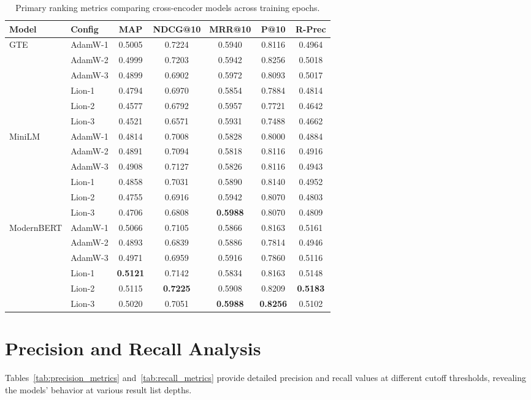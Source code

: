 \begin{table}[htbp]
\centering
\caption{Primary ranking metrics comparing cross-encoder models across training epochs.}
\label{tab:primary_metrics}
\small
\begin{tabular}{llccccc}
\toprule
\textbf{Model} & \textbf{Config} & \textbf{MAP} & \textbf{NDCG@10} & \textbf{MRR@10} & \textbf{P@10} & \textbf{R-Prec} \\
\midrule
\multirow{6}{*}{GTE} & AdamW-1 & 0.5005 & 0.7224 & 0.5940 & 0.8116 & 0.4964 \\
 & AdamW-2 & 0.4999 & 0.7203 & 0.5942 & 0.8256 & 0.5018 \\
 & AdamW-3 & 0.4899 & 0.6902 & 0.5972 & 0.8093 & 0.5017 \\
 & Lion-1 & 0.4794 & 0.6970 & 0.5854 & 0.7884 & 0.4814 \\
 & Lion-2 & 0.4577 & 0.6792 & 0.5957 & 0.7721 & 0.4642 \\
 & Lion-3 & 0.4521 & 0.6571 & 0.5931 & 0.7488 & 0.4662 \\
\midrule
\multirow{6}{*}{MiniLM} & AdamW-1 & 0.4814 & 0.7008 & 0.5828 & 0.8000 & 0.4884 \\
 & AdamW-2 & 0.4891 & 0.7094 & 0.5818 & 0.8116 & 0.4916 \\
 & AdamW-3 & 0.4908 & 0.7127 & 0.5826 & 0.8116 & 0.4943 \\
 & Lion-1 & 0.4858 & 0.7031 & 0.5890 & 0.8140 & 0.4952 \\
 & Lion-2 & 0.4755 & 0.6916 & 0.5942 & 0.8070 & 0.4803 \\
 & Lion-3 & 0.4706 & 0.6808 & \textbf{0.5988} & 0.8070 & 0.4809 \\
\midrule
\multirow{6}{*}{ModernBERT} & AdamW-1 & 0.5066 & 0.7105 & 0.5866 & 0.8163 & 0.5161 \\
 & AdamW-2 & 0.4893 & 0.6839 & 0.5886 & 0.7814 & 0.4946 \\
 & AdamW-3 & 0.4971 & 0.6959 & 0.5916 & 0.7860 & 0.5116 \\
 & Lion-1 & \textbf{0.5121} & 0.7142 & 0.5834 & 0.8163 & 0.5148 \\
 & Lion-2 & 0.5115 & \textbf{0.7225} & 0.5908 & 0.8209 & \textbf{0.5183} \\
 & Lion-3 & 0.5020 & 0.7051 & \textbf{0.5988} & \textbf{0.8256} & 0.5102 \\
\bottomrule
\end{tabular}
\end{table}

\section{Precision and Recall Analysis}
Tables~\ref{tab:precision_metrics} and~\ref{tab:recall_metrics} provide detailed precision and recall values at different cutoff thresholds, revealing the models' behavior at various result list depths.

